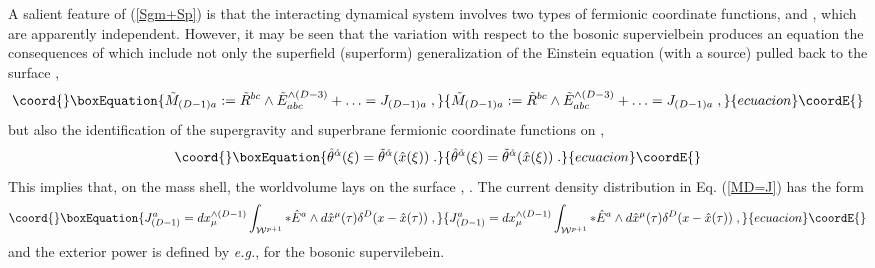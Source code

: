 \documentclass[a4paper,11pt]{article}
\begin{document}
A salient feature of (\ref{Sgm+Sp}) is that the interacting 
dynamical system involves two types of fermionic coordinate functions, 
\coordHE{} and 
\myHighlight{$\hat{\theta}^{\check{\alpha}} (\xi)$}\coordHE{}, which are apparently 
independent. However, it may be seen \cite{BAIL} that 
the variation with respect to the bosonic supervielbein produces 
an equation the consequences of which include not 
only the superfield (superform) generalization of the Einstein equation  
(with a source)   
pulled back to the surface \coordHE{}, 
\begin{equation}\coord{}\boxEquation{
  \label{MD=J} 
\tilde{M}_{(D-1)a}:= \tilde{R}^{bc} \wedge \tilde{E}^{\wedge (D-3)}_{abc} 
+ \ldots = J_{(D-1)a} \; ,  
}{
  \tilde{M}_{(D-1)a}:= \tilde{R}^{bc} \wedge \tilde{E}^{\wedge (D-3)}_{abc} 
+ \ldots = J_{(D-1)a} \; ,  
}{ecuacion}\coordE{}\end{equation} 
but also the identification of the supergravity and superbrane 
fermionic coordinate functions on \coordHE{} \cite{BAIL}, 
\begin{equation}\coord{}\boxEquation{
  \label{th=th} 
\hat{\theta}^{\check{\alpha}} (\xi)= 
\tilde{\theta}^{\check{\alpha}} (\hat{x}(\xi)) \; . 
}{
  \hat{\theta}^{\check{\alpha}} (\xi)= 
\tilde{\theta}^{\check{\alpha}} (\hat{x}(\xi)) \; . 
}{ecuacion}\coordE{}\end{equation} 
This implies that, on the mass shell, the worldvolume \coordHE{} 
lays on the surface \coordHE{}, \coordHE{}. 
The \coordHE{} current density distribution \coordHE{}
in Eq. (\ref{MD=J}) has the form 
\begin{equation}\coord{}\boxEquation{\label{JD=} 
J^a_{(D-1)}  = dx^{\wedge (D-1)}_\mu \int_{{\cal W}^{p+1}} *\hat{E}^a \wedge 
d\hat{x}^\mu (\tau)  \delta^D(x - \hat{x}(\tau))\; , 
}{J^a_{(D-1)}  = dx^{\wedge (D-1)}_\mu \int_{{\cal W}^{p+1}} *\hat{E}^a \wedge 
d\hat{x}^\mu (\tau)  \delta^D(x - \hat{x}(\tau))\; , 
}{ecuacion}\coordE{}\end{equation} 
and the exterior power is defined by {\it e.g.}, 
\coordHE{} for the bosonic 
supervilebein.
\end{document}
